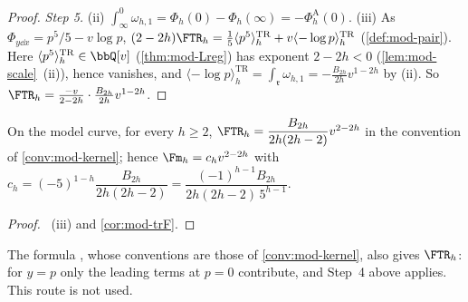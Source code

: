\begin{proof}
\emph{Step 5.} (ii) $\int_\infty^0\omega_{h,1}=\Phi_h(0)-\Phi_h(\infty)=-\Phi^{\mathrm A}_h(0)$. (iii) As $\Phi_{y\dd x}=p^5/5-v\log p$, $(2-2h)\FTR_h=\frac15\langle p^5\rangle^{\mathrm{TR}}_h+v\langle-\log p\rangle^{\mathrm{TR}}_h$ (\cref{def:mod-pair}). Here $\langle p^5\rangle^{\mathrm{TR}}_h\in\bbQ[v]$ (\cref{thm:mod-Lreg}) has exponent $2-2h<0$ (\cref{lem:mod-scale}~(ii)), hence vanishes, and $\langle-\log p\rangle^{\mathrm{TR}}_h=\int_{\mathfrak r}\omega_{h,1}=-\frac{B_{2h}}{2h}v^{1-2h}$ by (ii). So $\FTR_h=\frac{-v}{2-2h}\cdot\frac{B_{2h}}{2h}v^{1-2h}$.
\end{proof}

\begin{thm}
\label{thm:mod-gap}
On the model curve, for every $h\geq 2$, $\FTR_h=\dfrac{B_{2h}}{2h(2h-2)}v^{2-2h}$ in the convention of \cref{conv:mod-kernel}; hence $\Fm_h=c_hv^{2-2h}$ with $c_h=(-5)^{1-h}\dfrac{B_{2h}}{2h(2h-2)}=\dfrac{(-1)^{h-1}B_{2h}}{2h(2h-2)\,5^{h-1}}$.
\end{thm}

\begin{proof}
~(iii) and \cref{cor:mod-trF}.
\end{proof}

\begin{rmk}
\label{rmk:mod-hock}
The formula \cite[Cor.~1.2, (1.3)]{Hock25}, whose conventions \cite[(2.1), (1.1)]{Hock25} are those of \cref{conv:mod-kernel}, also gives $\FTR_h$: for $y=p$ only the leading terms at $p=0$ contribute, and Step~4 above applies. This route is not used. 
\end{rmk}


